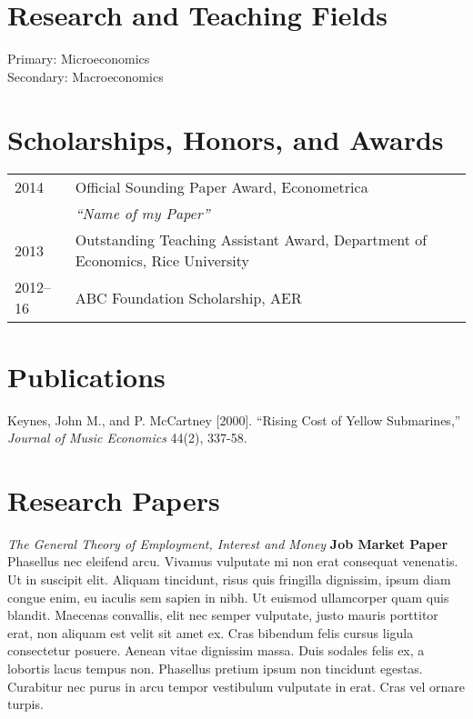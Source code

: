 \documentclass[11pt]{res} %
\begin{document}
\begin{resume}
\section{Research and Teaching Fields}
\vspace{6pt}

Primary: Microeconomics \\
Secondary: Macroeconomics

\section{Scholarships, Honors, and Awards}
\vspace{6pt}

\begin{tabular}{l l}
 2014     & Official Sounding Paper Award, Econometrica \\
          & \hspace{.5cm} \emph{``Name of my Paper''}   \\
 2013     & Outstanding Teaching Assistant Award, Department of Economics, Rice University \\
 2012--16 & ABC Foundation Scholarship, AER
\end{tabular}

\section{Publications}
\vspace{6pt}%

Keynes, John M., and P. McCartney [2000]. ``Rising Cost of Yellow Submarines,'' \emph{Journal of Music Economics} 44(2), 337-58.

\section{Research Papers}
\vspace{6pt}%

\emph{The General Theory of Employment, Interest and Money} \hfill \textbf{Job Market Paper}  \\
Phasellus nec eleifend arcu. Vivamus vulputate mi non erat consequat venenatis. Ut in suscipit elit. Aliquam tincidunt, risus quis fringilla dignissim, ipsum diam congue enim, eu iaculis sem sapien in nibh. Ut euismod ullamcorper quam quis blandit. Maecenas convallis, elit nec semper vulputate, justo mauris porttitor erat, non aliquam est velit sit amet ex. Cras bibendum felis cursus ligula consectetur posuere. Aenean vitae dignissim massa. Duis sodales felis ex, a lobortis lacus tempus non. Phasellus pretium ipsum non tincidunt egestas. Curabitur nec purus in arcu tempor vestibulum vulputate in erat. Cras vel ornare turpis. 


\end{resume}
\end{document}
